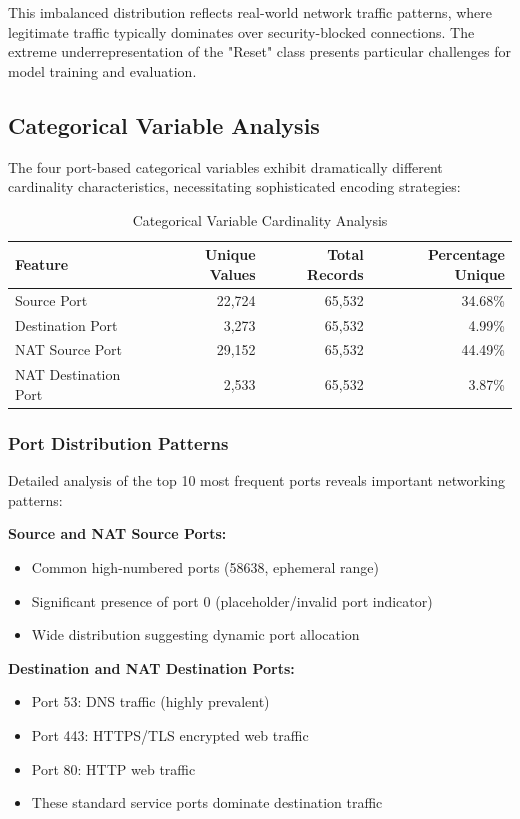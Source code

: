 \documentclass[12pt,a4paper]{article}
\begin{document}
This imbalanced distribution reflects real-world network traffic patterns, where legitimate traffic typically dominates over security-blocked connections. The extreme underrepresentation of the "Reset" class presents particular challenges for model training and evaluation.

\subsection{Categorical Variable Analysis}

The four port-based categorical variables exhibit dramatically different cardinality characteristics, necessitating sophisticated encoding strategies:

\begin{table}[H]
\centering
\begin{tabular}{@{}lrrr@{}}
\toprule
\textbf{Feature} & \textbf{Unique Values} & \textbf{Total Records} & \textbf{Percentage Unique} \\
\midrule
Source Port & 22,724 & 65,532 & 34.68\% \\
Destination Port & 3,273 & 65,532 & 4.99\% \\
NAT Source Port & 29,152 & 65,532 & 44.49\% \\
NAT Destination Port & 2,533 & 65,532 & 3.87\% \\
\bottomrule
\end{tabular}
\caption{Categorical Variable Cardinality Analysis}
\end{table}

\subsubsection{Port Distribution Patterns}

Detailed analysis of the top 10 most frequent ports reveals important networking patterns:

\textbf{Source and NAT Source Ports:}
\begin{itemize}
    \item Common high-numbered ports (58638, ephemeral range)
    \item Significant presence of port 0 (placeholder/invalid port indicator)
    \item Wide distribution suggesting dynamic port allocation
\end{itemize}

\textbf{Destination and NAT Destination Ports:}
\begin{itemize}
    \item Port 53: DNS traffic (highly prevalent)
    \item Port 443: HTTPS/TLS encrypted web traffic
    \item Port 80: HTTP web traffic
    \item These standard service ports dominate destination traffic
\end{itemize}
\end{document}
